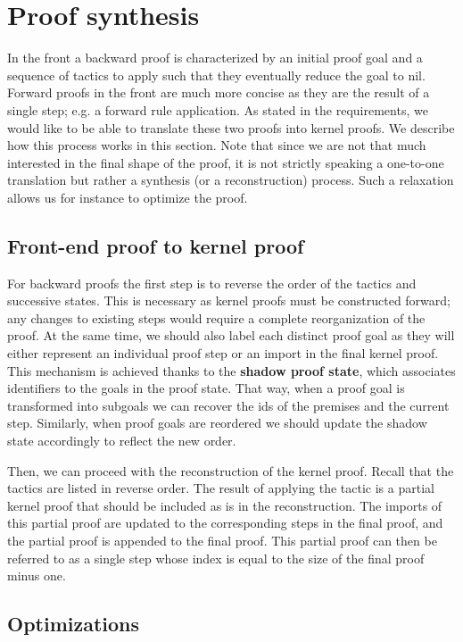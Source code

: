 \section{Proof synthesis}
\label{sec:synthesis}

In the front a backward proof is characterized by an initial proof goal and a sequence of tactics to apply such that they eventually reduce the goal to nil. Forward proofs in the front are much more concise as they are the result of a single step; e.g. a forward rule application. As stated in the requirements, we would like to be able to translate these two proofs into kernel proofs. We describe how this process works in this section. Note that since we are not that much interested in the final shape of the proof, it is not strictly speaking a one-to-one translation but rather a synthesis (or a reconstruction) process. Such a relaxation allows us for instance to optimize the proof.

\subsection{Front-end proof to kernel proof}

For backward proofs the first step is to reverse the order of the tactics and successive states. This is necessary as kernel proofs must be constructed forward; any changes to existing steps would require a complete reorganization of the proof. At the same time, we should also label each distinct proof goal as they will either represent an individual proof step or an import in the final kernel proof. This mechanism is achieved thanks to the \textbf{shadow proof state}, which associates identifiers to the goals in the proof state. That way, when a proof goal is transformed into subgoals we can recover the ids of the premises and the current step. Similarly, when proof goals are reordered we should update the shadow state accordingly to reflect the new order.

Then, we can proceed with the reconstruction of the kernel proof. Recall that the tactics are listed in reverse order. The result of applying the tactic is a partial kernel proof that should be included as is in the reconstruction. The imports of this partial proof are updated to the corresponding steps in the final proof, and the partial proof is appended to the final proof. This partial proof can then be referred to as a single step whose index is equal to the size of the final proof minus one.

\subsection{Optimizations}

